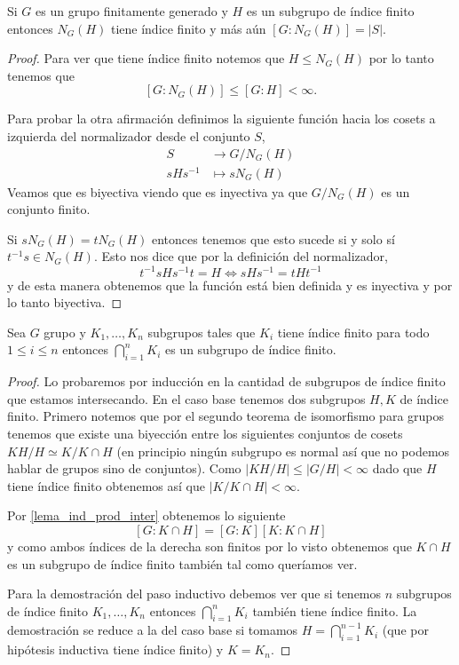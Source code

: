 \documentclass[tesis.tex]{subfiles}
\begin{document}
\begin{lema}\label{lema_normalizador_conjugados}
	Si $G$ es un grupo finitamente generado y $H$ es un subgrupo de índice finito entonces $N_G(H)$ tiene índice finito y más aún $[G:N_G(H)] = |S|$.
\end{lema}
\begin{proof}
	Para ver que tiene índice finito notemos que $H \le N_G(H)$ por lo tanto tenemos que 
	\[
	[G:N_G(H)] \le [G:H] < \infty.
	\]
	
	Para probar la otra afirmación definimos la siguiente función hacia los cosets a izquierda del normalizador desde el conjunto $S$,
	\begin{align*}
		S  &\to  G/N_G(H)  \\
		sHs^{-1} &\mapsto sN_G(H)
	\end{align*}
	Veamos que es biyectiva viendo que es inyectiva ya que $G/N_{G}(H)$ es un conjunto finito.
	
	Si $sN_G(H) = tN_G(H)$ entonces tenemos que esto sucede si y solo sí $t^{-1}s \in N_G(H)$.
	Esto nos dice que por la definición del normalizador,
	\[
	t^{-1}s H s^{-1}t = H \iff sHs^{-1} = tHt^{-1}
	\]
	y de esta manera obtenemos que la función está bien definida y es inyectiva y por lo tanto biyectiva.
	
\end{proof}


\begin{lema}\label{lema_indice_interseccion}
	Sea $G$ grupo y $K_1, \dots, K_n$ subgrupos tales que $K_{i}$ tiene índice finito para todo $ 1 \le i \le n $ entonces $\bigcap_{i=1}^{n} K_{i}$ es un subgrupo de índice finito.
\end{lema}
\begin{proof}
	Lo probaremos por inducción en la cantidad de subgrupos de índice finito que estamos intersecando.
	En el caso base tenemos dos subgrupos $H,K$ de índice finito.
	Primero notemos que por el segundo teorema de isomorfismo para grupos tenemos que existe una biyección entre los siguientes conjuntos de cosets $ KH / H \simeq K / K \cap H $ (en principio ningún subgrupo es normal así que no podemos hablar de grupos sino de conjuntos).
	Como  $|KH / H| \le |G / H| < \infty$ dado que $H$ tiene índice finito obtenemos así que $|K / K \cap H| < \infty$.
	
	Por \ref{lema_ind_prod_inter} obtenemos lo siguiente
	\[
	[G:K\cap H] = [G:K][K: K \cap H]
	\]
	y como ambos índices de la derecha son finitos por lo visto obtenemos que $K \cap H$ es un subgrupo de índice finito también tal como queríamos ver.
	
	Para la demostración del paso inductivo debemos ver que si tenemos $n$ subgrupos de índice finito $K_{1}, \dots, K_{n}$ entonces $\bigcap_{i=1}^{n} K_{i}$ también tiene índice finito.
	La demostración se reduce a la del caso base si tomamos $H = \bigcap_{i=1}^{n-1} K_{i}$ (que por hipótesis inductiva tiene índice finito) y $K = K_{n}$.
\end{proof}
\end{document}
